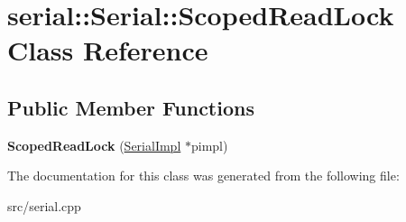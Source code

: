 \hypertarget{classserial_1_1_serial_1_1_scoped_read_lock}{}\section{serial\+:\+:Serial\+:\+:Scoped\+Read\+Lock Class Reference}
\label{classserial_1_1_serial_1_1_scoped_read_lock}
\subsection*{Public Member Functions}
\begin{DoxyCompactItemize}
\item 
{\bfseries Scoped\+Read\+Lock} (\hyperlink{classserial_1_1serial_1_1_serial_1_1_serial_impl}{Serial\+Impl} $\ast$pimpl)\hypertarget{classserial_1_1_serial_1_1_scoped_read_lock_a54f59663807d8adfe6db712ee6103503}{}\label{classserial_1_1_serial_1_1_scoped_read_lock_a54f59663807d8adfe6db712ee6103503}

\end{DoxyCompactItemize}


The documentation for this class was generated from the following file\+:\begin{DoxyCompactItemize}
\item 
src/serial.\+cpp\end{DoxyCompactItemize}
